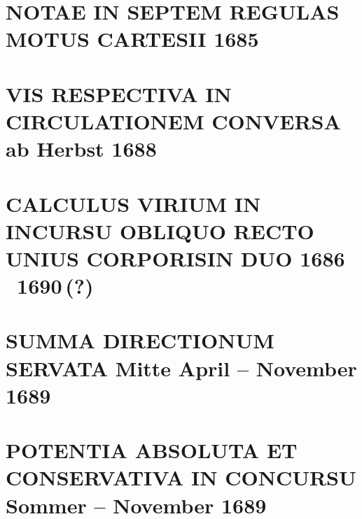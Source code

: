 \documentclass[%
fontsize=10pt,
]{scrbook}
\DeclareRobustCommand{\bracks}[1]{%
\textup{\lbrack}#1\textup{\rbrack}}
\begin{document}
\chapter[tocentry={Notae in septem regulas motus Cartesii 
\enskip \bracks{1685}},
head={Notae in septem regulas motus Cartesii}]%
{\MakeUppercase{Notae in septem regulas motus Cartesii}
\newline \bracks{1685}}

\label{60099}





\chapter[tocentry={Vis respectiva in circulationem conversa
\enskip\bracks{%
ab Herbst 1688%
}},
head={Vis respectiva in circulationem conversa}]%
{\MakeUppercase{Vis respectiva in circulationem conversa}
\newline\bracks{%
ab Herbst 1688%
}}
\label{60111}




\chapter[tocentry={Calculus virium in incursu obliquo recto unius corporis in duo 
\enskip \bracks{1686 \textendash\ 1690\,(?)}},
head={Calculus virium in incursu obliquo recto unius corporis in duo}]%
{\MakeUppercase{Calculus virium in incursu obliquo recto unius corporis\linebreak in duo}
\newline \bracks{1686 \textendash\ 1690\,(?)}}
\label{60048}




\chapter[tocentry={Summa directionum servata
\enskip\bracks{%
Mitte April -- November 1689%
}},
head={Summa directionum servata}]%
{\MakeUppercase{Summa directionum servata}
\newline\bracks{%
Mitte April -- November 1689%
}}
\label{58220}




\chapter[tocentry={Potentia absoluta et conservativa in concursu
\enskip\bracks{%
Sommer -- November 1689%
}},
head={Potentia absoluta et conservativa in concursu}]%
{\MakeUppercase{Potentia absoluta et conservativa in concursu}
\newline\bracks{%
Sommer -- November 1689%
}}
\label{58235}

\end{document}
